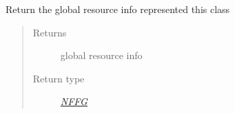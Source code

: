 \documentclass[letterpaper,10pt,english]{sphinxmanual}
\begin{document}
\begin{fulllineitems}

\begin{fulllineitems}
\label{adapt/adaptation:escape.adapt.adaptation.DomainVirtualizer.get_resource_info}
Return the global resource info represented this class
\begin{quote}\begin{description}
\item[{Returns}] \leavevmode
global resource info

\item[{Return type}] \leavevmode
{\hyperref[util/nffg:escape.util.nffg.NFFG]{\emph{NFFG}}}

\end{description}\end{quote}

\end{fulllineitems}


\end{fulllineitems}

\end{document}

